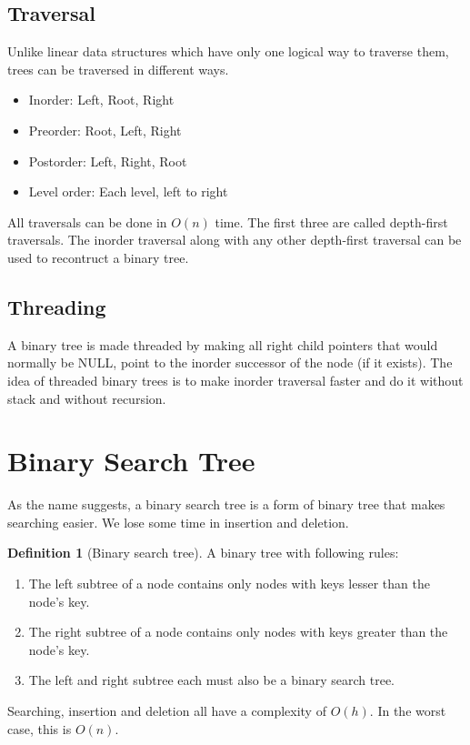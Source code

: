 \documentclass[10pt, a4paper]{extarticle}
\theoremstyle{definition}
\newtheorem{defn}{Definition}
\begin{document}
\subsection{Traversal}
Unlike linear data structures which have only one logical way to traverse them, trees can be traversed in different ways.
\begin{itemize}
	\item Inorder: Left, Root, Right
	\item Preorder: Root, Left, Right
	\item Postorder: Left, Right, Root
	\item Level order: Each level, left to right
\end{itemize}
All traversals can be done in $O(n)$ time. The first three are called depth-first traversals. The inorder traversal along with any other depth-first traversal can be used to recontruct a binary tree.
\subsection{Threading}
A binary tree is made threaded by making all right child pointers that would normally be NULL, point to the inorder successor of the node (if it exists). The idea of threaded binary trees is to make inorder traversal faster and do it without stack and without recursion.

\section{Binary Search Tree}
As the name suggests, a binary search tree is a form of binary tree that makes searching easier. We lose some time in insertion and deletion.

\begin{defn}[Binary search tree]
	A binary tree with following rules:
	\begin{enumerate}
		\item The left subtree of a node contains only nodes with keys lesser than the node’s key.
		\item The right subtree of a node contains only nodes with keys greater than the node’s key.
		\item The left and right subtree each must also be a binary search tree.
	\end{enumerate}
\end{defn}
Searching, insertion and deletion all have a complexity of $O(h)$. In the worst case, this is $O(n)$.
\end{document}
